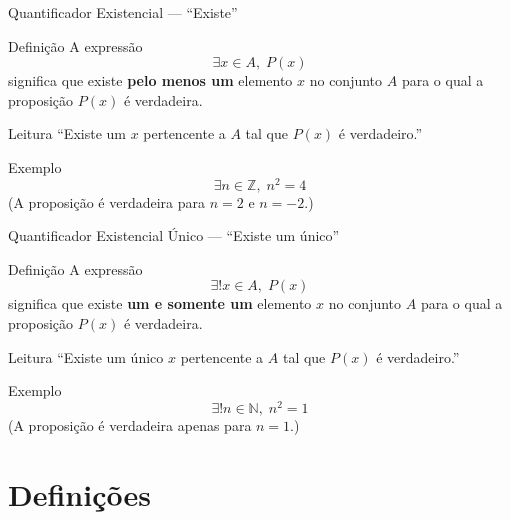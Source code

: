 \documentclass[9pt]{beamer}
\begin{document}
\begin{frame}{Quantificador Existencial — ``Existe''}

\begin{block}{Definição}
A expressão
\[
\exists x \in A,\; P(x)
\]
significa que existe \textbf{pelo menos um} elemento \(x\) no conjunto \(A\) para o qual a proposição \(P(x)\) é verdadeira.
\end{block}

\vspace{0.4cm}

\begin{block}{Leitura}
``Existe um \(x\) pertencente a \(A\) tal que \(P(x)\) é verdadeiro.''
\end{block}

\vspace{0.4cm}

\begin{block}{Exemplo}
\[
\exists n \in \mathbb{Z},\; n^2 = 4
\]
(A proposição é verdadeira para \(n = 2\) e \(n = -2\).)
\end{block}

\end{frame}

\begin{frame}{Quantificador Existencial Único — ``Existe um único''}

\begin{block}{Definição}
A expressão
\[
\exists! x \in A,\; P(x)
\]
significa que existe \textbf{um e somente um} elemento \(x\) no conjunto \(A\) para o qual a proposição \(P(x)\) é verdadeira.
\end{block}

\vspace{0.4cm}

\begin{block}{Leitura}
``Existe um único \(x\) pertencente a \(A\) tal que \(P(x)\) é verdadeiro.''
\end{block}

\vspace{0.4cm}

\begin{block}{Exemplo}
\[
\exists! n \in \mathbb{N},\; n^2 = 1
\]
(A proposição é verdadeira apenas para \(n = 1\).)
\end{block}

\end{frame}

\section{Definições}
\end{document}
